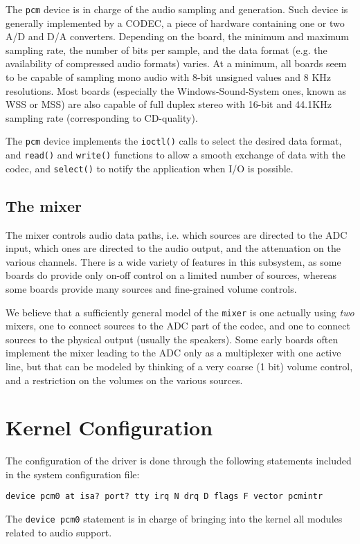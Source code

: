 \documentclass[11pt]{article}
\begin{document}
The {\tt pcm} device is in charge of the audio sampling and
generation. Such device is generally implemented by a CODEC, a piece
of hardware containing one or two A/D and D/A converters. Depending on
the board, the minimum and maximum sampling rate, the number of bits
per sample, and the data format (e.g. the availability of compressed
audio formats) varies. At a minimum, all boards seem to be capable of
sampling mono audio with 8-bit unsigned values and 8 KHz resolutions.
Most boards (especially the Windows-Sound-System ones, known as WSS or
MSS) are also capable of full duplex stereo with 16-bit and 44.1KHz
sampling rate (corresponding to CD-quality).

The {\tt pcm} device implements the {\tt ioctl()} calls to select the
desired data format, and {\tt read()} and {\tt write()} functions to
allow a smooth exchange of data with the codec, and {\tt select()} to
notify the application when I/O is possible.


\subsection{The mixer}

The mixer controls audio data paths, i.e. which sources are directed
to the ADC input, which ones are directed to the audio output, and the
attenuation on the various channels. There is a wide variety of
features in this subsystem, as some boards do provide only on-off
control on a limited number of sources, whereas some boards provide
many sources and fine-grained volume controls.

We believe that a sufficiently general model of the {\tt mixer}
is one actually using {\em two} mixers, one to connect sources to the
ADC part of the codec, and one to connect sources to the physical
output (usually the speakers). Some early boards often implement the
mixer leading to the ADC only as a multiplexer with one active line,
but that can be modeled by thinking of a very coarse (1 bit) volume
control, and a restriction on the volumes on the various sources.


\section{Kernel Configuration}

The configuration of the driver is done through the following
statements included in the system configuration file:
\begin{verbatim}
device pcm0 at isa? port? tty irq N drq D flags F vector pcmintr
\end{verbatim}
The {\tt device pcm0} statement is in charge of bringing into the
kernel all modules related to audio support.
\end{document}
